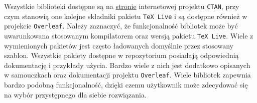 Wszystkie biblioteki dostępne są na \href{https://ctan.org/}{stronie} internetowej projektu \texttt{CTAN}, przy czym stanowią one kolejne składniki pakietu \texttt{TeX Live} i są dostępne również w projekcie \texttt{Overleaf}. Należy zaznaczyć, że funkcjonalność bibliotek może być uwarunkowana stosowanym kompilatorem oraz wersją pakietu \texttt{TeX Live}. Wiele z wymienionych pakietów jest często ładowanych domyślnie przez stosowany szablon. Wszystkie pakiety dostępne w repozytorium posiadają odpowiednią dokumentację i przykłady użycia. Bardzo wiele z nich jest dodatkowo opisanych w samouczkach oraz dokumentacji projektu \texttt{Overleaf}. Wiele bibliotek zapewnia bardzo podobną funkcjonalność, dzięki czemu użytkownik może zdecydować się na wybór przystępnego dla siebie rozwiązania.
